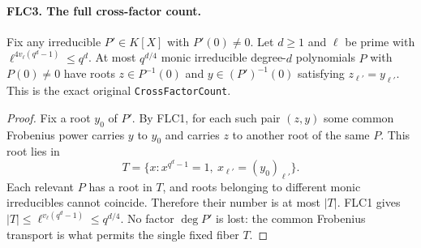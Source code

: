 \paragraph{FLC3. The full cross-factor count.}
\label{claim:FLC3}
Fix any irreducible $P'\in K[X]$ with $P'(0)\ne0$.
Let $d\ge1$ and $\ell$ be prime with
$\ell^{4v_\ell(q^d-1)}\le q^d$.
At most $q^{d/4}$ monic irreducible degree-$d$ polynomials $P$
with $P(0)\ne0$ have roots $z\in P^{-1}(0)$ and
$y\in(P')^{-1}(0)$ satisfying $z_{\ell'}=y_{\ell'}$.
This is the exact original \texttt{CrossFactorCount}.
\begin{proof}
Fix a root $y_0$ of $P'$.  By FLC1, for each such pair $(z,y)$
some common Frobenius power carries $y$ to $y_0$ and carries $z$
to another root of the same $P$.  This root lies in
\[
 T=\{x:x^{q^d-1}=1,\ x_{\ell'}=(y_0)_{\ell'}\}.
\]
Each relevant $P$ has a root in $T$, and roots belonging to
different monic irreducibles cannot coincide.  Therefore their
number is at most $|T|$.  FLC1 gives
$|T|\le\ell^{v_\ell(q^d-1)}\le q^{d/4}$.
No factor $\deg P'$ is lost: the common Frobenius transport is
what permits the single fixed fiber $T$.
\end{proof}

